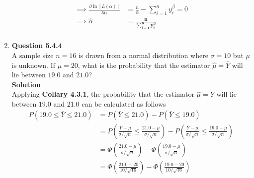 \documentclass{uofa-eng-assignment}
\begin{document}
\begin{enumerate}
\begin{align*}
            \implies
            \frac{\partial \ln [L(\alpha)]}{\partial \alpha} & = \frac{n}{\alpha} - \sum_{i=1}^{n} y_i^\beta = 0                                                   \\ \implies
            \hat{\alpha}                                     & =\boldsymbol{\frac{n}{\sum_{i=1}^{n} y_i^\beta}}                                                    \\
            \boldsymbol{}
        \end{align*}
    \item[]
        \textbf{Question 5.4.4} \\
        A sample size $n = 16$ is drawn from a normal distribution where $\sigma = 10$ but $\mu$ is unknown.
        If $\mu = 20$, what is the probability that the estimator $\hat{\mu} = \bar{Y}$ will lie between
        $19.0$ and $21.0$? \\
        \textbf{Solution} \\
        Applying \textbf{Collary 4.3.1}, the probability that the estimator $\hat{\mu} = \bar{Y}$ will lie between $19.0$ and $21.0$ can be
        calculated as follows
        \begin{align*}
            P(19.0 \leq \bar{Y} \leq 21.0) & = P(\bar{Y} \leq 21.0) - P(\bar{Y} \leq 19.0)                                                                                                                                                       \\
                                           & = P\left(\frac{\bar{Y} - \mu}{\sigma / \sqrt{n}} \leq \frac{21.0 - \mu}{\sigma / \sqrt{n}}\right) - P\left(\frac{\bar{Y} - \mu}{\sigma / \sqrt{n}} \leq \frac{19.0 - \mu}{\sigma / \sqrt{n}}\right) \\
                                           & = \Phi\left(\frac{21.0 - \mu}{\sigma / \sqrt{n}}\right) - \Phi\left(\frac{19.0 - \mu}{\sigma / \sqrt{n}}\right)                                                                                     \\
                                           & = \Phi\left(\frac{21.0 - 20}{10 / \sqrt{16}}\right) - \Phi\left(\frac{19.0 - 20}{10 / \sqrt{16}}\right)                                                                                             \\

\end{align*}
\end{enumerate}
\end{document}
